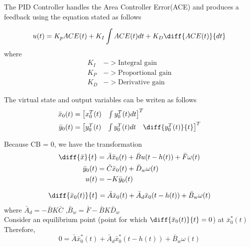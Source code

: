 \documentclass[journal]{IEEEtran}
\begin{document}
The PID Controller handles the Area Controller Error(ACE) and produces a feedback 
using the equation stated as follows

\begin{equation}
  u(t)=K_pACE(t) + K_I\int ACE(t)dt + K_D \diff{ACE(t)}{dt}
\end{equation}
where
\begin{align}
  K_I &-> \text{Integral gain}\\
  K_P &-> \text{Proportional gain} \\
K_D &->\text{Derivative gain}
\end{align}


The virtual state and output variables can be writen as follows
\begin{align}
  \bar{x}_0(t) &= 
  \begin{bmatrix}
    x_0^T(t) & \int y_0^T(t) dt
  \end{bmatrix}^T \\
  \bar{y}_0(t) &= 
  \begin{bmatrix}
    y_0^T(t) & \int y_0^T(t)dt & \diff{y_0^T(t)}{t}
  \end{bmatrix}^T
\end{align}

Because CB = 0, we have the transformation
\begin{align}
  \diff{\bar{x}}{t} &= \bar{A}\bar{x}_0(t) + \bar{B}u(t-h(t)) + \bar{F}\omega (t) \\
  \bar{y}_0(t) &= \bar{C}\bar{x}_0(t) + \bar{D}_w\omega(t) \\
  u(t)&= -K\bar{y}_0(t)
\end{align}

\begin{align}
  \diff{\bar{x}_{0}(t)}{t} = \bar{A}\bar{x}_{0}(t) + \bar{A}_{d}\bar{x}_{0}(t-h(t)) + \bar{B}_w\omega(t) \\
\end{align}
where $\bar{A}_{d}= -\bar{B}K\bar{C}$ ,$\bar{B}_w = \bar{F} - \bar{B}K\bar{D}_w $\\

Consider an equilibrium point (point for which $\diff{\bar{x}_0(t)}{t} = 0$) at $\bar{x}_0^*(t)$
Therefore,           
\begin{equation}
  0 = \bar{A}\bar{x}_0^*(t) + \bar{A}_d\bar{x}_0^*(t-h(t)) + \bar{B}_w\omega(t)
\end{equation}
\end{document}
